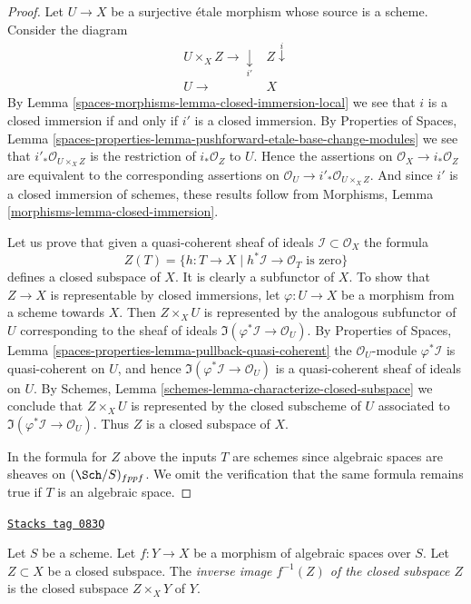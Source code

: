 \begin{proof}
Let $U \to X$ be a surjective \'etale morphism whose source is a scheme.
Consider the diagram
$$
\begin{array}{cc}U \times_X Z \longrightarrow\underset{i'}{\downarrow} & Z \overset{i}{\downarrow} \\ U \longrightarrow & X\end{array}
$$
By
Lemma \ref{spaces-morphisms-lemma-closed-immersion-local}
we see that $i$ is a closed immersion
if and only if $i'$ is a closed immersion. By
Properties of Spaces,
Lemma \ref{spaces-properties-lemma-pushforward-etale-base-change-modules}
we see that $i'_*\mathcal{O}_{U \times_X Z}$ is the restriction of
$i_*\mathcal{O}_Z$ to $U$. Hence the assertions on
$\mathcal{O}_X \to i_*\mathcal{O}_Z$ are equivalent to the
corresponding assertions on
$\mathcal{O}_U \to i'_*\mathcal{O}_{U \times_X Z}$.
And since $i'$ is a closed immersion of schemes, these results follow from
Morphisms, Lemma \ref{morphisms-lemma-closed-immersion}.

\medskip\noindent
Let us prove that given a quasi-coherent
sheaf of ideals $\mathcal{I} \subset \mathcal{O}_X$ the formula
$$
Z(T) = \{h : T \to X \mid h^*\mathcal{I} \to \mathcal{O}_T
\text{ is zero}\}
$$
defines a closed subspace of $X$. It is clearly a subfunctor of $X$.
To show that $Z \to X$ is representable by closed immersions, let
$\varphi : U \to X$ be a morphism from a scheme towards $X$. Then
$Z \times_X U$ is represented by the analogous subfunctor of $U$ corresponding
to the sheaf of ideals $\Im(\varphi^*\mathcal{I} \to \mathcal{O}_U)$. By
Properties of Spaces,
Lemma \ref{spaces-properties-lemma-pullback-quasi-coherent}
the $\mathcal{O}_U$-module $\varphi^*\mathcal{I}$ is quasi-coherent
on $U$, and hence $\Im(\varphi^*\mathcal{I} \to \mathcal{O}_U)$
is a quasi-coherent sheaf of ideals on $U$. By
Schemes, Lemma \ref{schemes-lemma-characterize-closed-subspace}
we conclude that $Z \times_X U$ is represented by the closed subscheme
of $U$ associated to $\Im(\varphi^*\mathcal{I} \to \mathcal{O}_U)$.
Thus $Z$ is a closed subspace of $X$.

\medskip\noindent
In the formula for $Z$ above the inputs $T$ are schemes since algebraic
spaces are sheaves on $(\Sch/S)_{fppf}$. We omit the verification
that the same formula remains true if $T$ is an algebraic space.
\end{proof}

\begin{definition}
\label{spaces-morphisms-definition-inverse-image-closed-subspace}
\href{https://stacks.math.columbia.edu/tag/083Q}{\texttt{Stacks tag 083Q}}

Let $S$ be a scheme. Let $f : Y \to X$ be a morphism of algebraic spaces
over $S$. Let $Z \subset X$ be a closed subspace. The
{\it inverse image $f^{-1}(Z)$ of the closed subspace $Z$}
is the closed subspace $Z \times_X Y$ of $Y$.
\end{definition}

